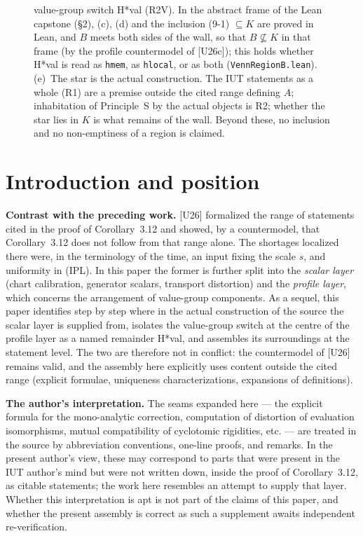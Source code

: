 \documentclass[11pt]{article}
\begin{document}
\begin{figure}[!htb]
{value-group switch H*val (R2V).  In the abstract frame of the Lean
capstone (\S2), (c), (d) and the inclusion (9-1) $\subseteq K$ are
proved in Lean, and $B$ meets both sides of the wall, so that
$B\not\subseteq K$ in that frame (by the profile countermodel of
[U26c]); this holds whether H*val is read as \texttt{hmem}, as
\texttt{hlocal}, or as both (\texttt{VennRegionB.lean}).
(e)~The star is the actual construction.  The IUT statements as a
whole (R1) are a premise outside the cited range defining $A$;
inhabitation of Principle~S by the actual objects is R2; whether the
star lies in $K$ is what remains of the wall.
Beyond these, no inclusion and no non-emptiness of a region is
claimed.}
\label{fig:venn}
\end{figure}

\section{Introduction and position}

\textbf{Contrast with the preceding work.}  [U26] formalized the
range of statements cited in the proof of Corollary~3.12 and showed,
by a countermodel, that Corollary~3.12 does not follow from that
range alone.  The shortages localized there were, in the terminology
of the time, an input fixing the scale $s$, and uniformity in (IPL).
In this paper the former is further split into the \emph{scalar
layer} (chart calibration, generator scalars, transport distortion)
and the \emph{profile layer}, which concerns the arrangement of
value-group components.  As a sequel, this paper identifies step by
step where in the actual construction of the source the scalar layer
is supplied from, isolates the value-group switch at the centre of
the profile layer as a named remainder H*val, and assembles its
surroundings at the statement level.  The two are therefore not in
conflict: the countermodel of [U26] remains valid, and the assembly
here explicitly uses content outside the cited range (explicit
formulae, uniqueness characterizations, expansions of definitions).

\textbf{The author's interpretation.}  The seams expanded here ---
the explicit formula for the mono-analytic correction, computation
of distortion of evaluation isomorphisms, mutual compatibility of
cyclotomic rigidities, etc. --- are treated in the source by
abbreviation conventions, one-line proofs, and remarks.  In the
present author's view, these may correspond to parts that were
present in the IUT author's mind but were not written down, inside
the proof of Corollary~3.12, as citable statements; the work here
resembles an attempt to supply that layer.  Whether this
interpretation is apt is not part of the claims of this paper, and
whether the present assembly is correct as such a supplement awaits
independent re-verification.
\end{document}
